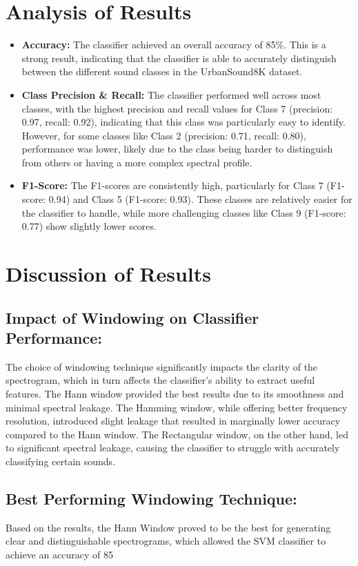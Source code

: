 \documentclass[a4paper,12pt]{article}
\begin{document}
\section{Analysis of Results}
\begin{itemize}
\item \textbf{Accuracy:} The classifier achieved an overall accuracy of 85\%. This is a strong result, indicating that the classifier is able to accurately distinguish between the different sound classes in the UrbanSound8K dataset.

\item \textbf{Class Precision \& Recall:} The classifier performed well across most classes, with the highest precision and recall values for Class 7 (precision: 0.97, recall: 0.92), indicating that this class was particularly easy to identify. However, for some classes like Class 2 (precision: 0.71, recall: 0.80), performance was lower, likely due to the class being harder to distinguish from others or having a more complex spectral profile.

\item \textbf{F1-Score:} The F1-scores are consistently high, particularly for Class 7 (F1-score: 0.94) and Class 5 (F1-score: 0.93). These classes are relatively easier for the classifier to handle, while more challenging classes like Class 9 (F1-score: 0.77) show slightly lower scores.
\end{itemize}
\newpage
\section{Discussion of Results}

\subsection{Impact of Windowing on Classifier Performance:}
The choice of windowing technique significantly impacts the clarity of the spectrogram, which in turn affects the classifier's ability to extract useful features. The Hann window provided the best results due to its smoothness and minimal spectral leakage. The Hamming window, while offering better frequency resolution, introduced slight leakage that resulted in marginally lower accuracy compared to the Hann window. The Rectangular window, on the other hand, led to significant spectral leakage, causing the classifier to struggle with accurately classifying certain sounds.

\subsection{Best Performing Windowing Technique:}
Based on the results, the Hann Window proved to be the best for generating clear and distinguishable spectrograms, which allowed the SVM classifier to achieve an accuracy of 85%
\newpage
\end{document}
